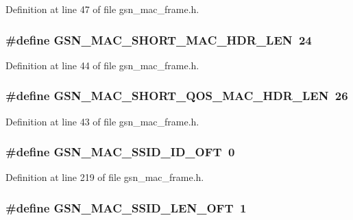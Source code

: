 Definition at line 47 of file gsn\_\-mac\_\-frame.h.

\hypertarget{a00523_af70d09cf42757e280b3df6217aaf96b9}{
\subsubsection[{GSN\_\-MAC\_\-SHORT\_\-MAC\_\-HDR\_\-LEN}]{\setlength{\rightskip}{0pt plus 5cm}\#define GSN\_\-MAC\_\-SHORT\_\-MAC\_\-HDR\_\-LEN~24}}
\label{a00523_af70d09cf42757e280b3df6217aaf96b9}


Definition at line 44 of file gsn\_\-mac\_\-frame.h.

\hypertarget{a00523_a994deebc682a29005c926f23174abab2}{
\subsubsection[{GSN\_\-MAC\_\-SHORT\_\-QOS\_\-MAC\_\-HDR\_\-LEN}]{\setlength{\rightskip}{0pt plus 5cm}\#define GSN\_\-MAC\_\-SHORT\_\-QOS\_\-MAC\_\-HDR\_\-LEN~26}}
\label{a00523_a994deebc682a29005c926f23174abab2}


Definition at line 43 of file gsn\_\-mac\_\-frame.h.

\hypertarget{a00523_ab9d8007d47e42460dec2f7fb1c0a70d2}{
\subsubsection[{GSN\_\-MAC\_\-SSID\_\-ID\_\-OFT}]{\setlength{\rightskip}{0pt plus 5cm}\#define GSN\_\-MAC\_\-SSID\_\-ID\_\-OFT~0}}
\label{a00523_ab9d8007d47e42460dec2f7fb1c0a70d2}


Definition at line 219 of file gsn\_\-mac\_\-frame.h.

\hypertarget{a00523_afd46ed8cc0cc1fb3ae986b3ee5e1bd60}{
\subsubsection[{GSN\_\-MAC\_\-SSID\_\-LEN\_\-OFT}]{\setlength{\rightskip}{0pt plus 5cm}\#define GSN\_\-MAC\_\-SSID\_\-LEN\_\-OFT~1}}
\label{a00523_afd46ed8cc0cc1fb3ae986b3ee5e1bd60}


